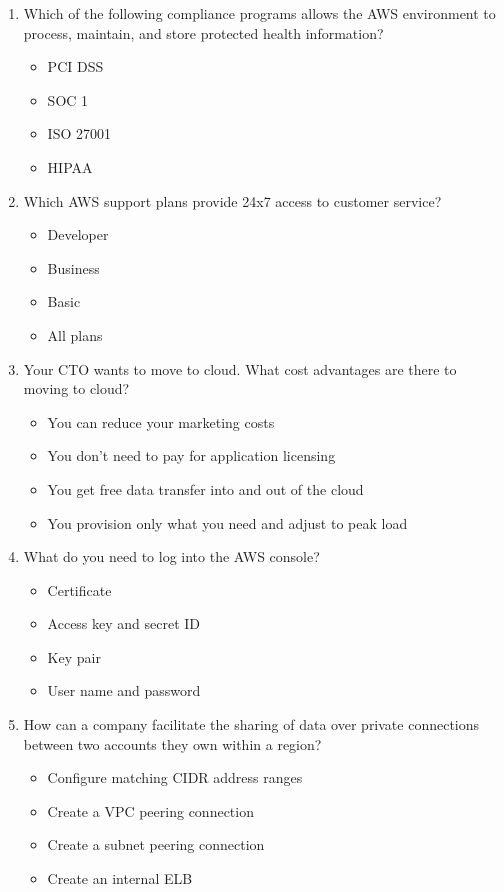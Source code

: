 \begin{enumerate}
	\item Which of the following compliance programs allows the AWS environment to process, maintain, and store protected health information?
	\begin{itemize}
		\item PCI DSS
		\item SOC 1
		\item ISO 27001
		\item HIPAA
	\end{itemize}

	\item Which AWS support plans provide 24x7 access to customer service?
	\begin{itemize}
		\item Developer
		\item Business
		\item Basic
		\item All plans
	\end{itemize}

	\item Your CTO wants to move to cloud. What cost advantages are there to moving to cloud?
	\begin{itemize}
		\item You can reduce your marketing costs
		\item You don’t need to pay for application licensing
		\item You get free data transfer into and out of the cloud
		\item You provision only what you need and adjust to peak load
	\end{itemize}

	\item What do you need to log into the AWS console?
	\begin{itemize}
		\item Certificate
		\item Access key and secret ID
		\item Key pair
		\item User name and password
	\end{itemize}

	\item How can a company facilitate the sharing of data over private connections between two accounts they own within a region?
	\begin{itemize}
		\item Configure matching CIDR address ranges
		\item Create a VPC peering connection
		\item Create a subnet peering connection
		\item Create an internal ELB
	\end{itemize}


\end{enumerate}
